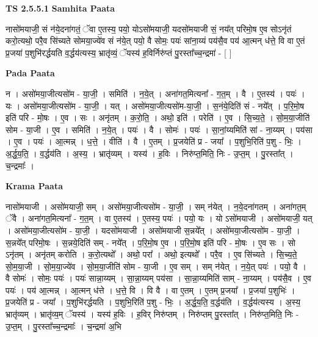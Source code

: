\documentclass[17pt]{extarticle}
\begin{document}
\textbf{TS 2.5.5.1 } \newline
\textbf{Samhita Paata} \newline

नासो॑मयाजी॒ सं न॑ये॒दना॑गतं॒ ॅवा ए॒तस्य॒ पयो॒ योऽसो॑मयाजी॒ यदसो॑मयाजी सं॒ नय᳚त् परिमो॒ष ए॒व सोऽनृ॑तं करो॒त्यथो॒ परै॒व सि॑च्यते सोमया॒ज्ये॑व सं न॑ये॒त् पयो॒ वै सोमः॒ पयः॑ सांना॒य्यं पय॑सै॒व पय॑ आ॒त्मन् ध॑त्ते॒ वि वा ए॒तं प्र॒जया॑ प॒शुभि॑रर्द्धयति व॒र्द्धय॑त्यस्य॒ भ्रातृ॑व्यं॒ ॅयस्य॑ ह॒विर्निरु॑प्तं पु॒रस्ता᳚च्च॒न्द्रमा॑ - [  ] \newline

\textbf{Pada Paata} \newline

न । असो॑मया॒जीत्यसो॑म - या॒जी॒ । समिति॑ । न॒ये॒त् । अना॑गत॒मित्यना᳚ - ग॒त॒म् । वै । ए॒तस्य॑ । पयः॑ । यः । असो॑मया॒जीत्यसो॑म - या॒जी॒ । यत् । असो॑मया॒जीत्यसो॑म-या॒जी॒ । स॒नंये॒दिति॑ सं - नये᳚त् । प॒रि॒मो॒ष इति॑ परि - मो॒षः । ए॒व । सः । अनृ॑तम् । क॒रो॒ति॒ । अथो॒ इति॑ । परेति॑ । ए॒व । सि॒च्य॒ते॒ । सो॒म॒या॒जीति॑ सोम - या॒जी । ए॒व । समिति॑ । न॒ये॒त् । पयः॑ । वै । सोमः॑ । पयः॑ । सा॒नां॒य्यमिति॑ सां - ना॒य्यम् । पय॑सा । ए॒व । पयः॑ । आ॒त्मन्न् । ध॒त्ते॒ । वीति॑ । वै । ए॒तम् । प्र॒जयेति॑ प्र - जया᳚ । प॒शुभि॒रिति॑ प॒शु - भिः॒ । अ॒र्द्ध॒य॒ति॒ । व॒र्द्धय॑ति । अ॒स्य॒ । भ्रातृ॑व्यम् । यस्य॑ । ह॒विः । निरु॑प्त॒मिति॒ निः - उ॒प्त॒म् । पु॒रस्ता᳚त् । च॒न्द्रमाः᳚ ।  \newline


\textbf{Krama Paata} \newline

नासो॑मयाजी । असो॑मयाजी॒ सम् । असो॑मया॒जीत्यसो॑म - या॒जी॒ । सम् न॑येत् । न॒ये॒दना॑गतम् । अना॑गत॒म् ॅवै । अना॑गत॒मित्यना᳚ - ग॒त॒म् । वा ए॒तस्य॑ । ए॒तस्य॒ पयः॑ । पयो॒ यः । यो ऽसो॑मयाजी । असो॑मयाजी॒ यत् । असो॑मया॒जीत्यसो॑म - या॒जी॒ । यदसो॑मयाजी । असो॑मयाजी स॒न्नये᳚त् । असो॑मया॒जीत्यसो॑म - या॒जी॒ । स॒न्नये᳚त् परिमो॒षः । स॒न्नये॒दिति॑ सम् - नये᳚त् । प॒रि॒मो॒ष ए॒व । प॒रि॒मो॒ष इति॑ परि - मो॒षः । ए॒व सः । सो ऽनृ॑तम् । अनृ॑तम् करोति । क॒रो॒त्यथो᳚ । अथो॒ परा᳚ । अथो॒ इत्यथो᳚ । परै॒व । ए॒व सि॑च्यते । सि॒च्य॒ते॒ सो॒म॒या॒जी । सो॒म॒या॒ज्ये॑व । सो॒म॒या॒जीति॑ सोम - या॒जी । ए॒व सम् । सम् न॑येत् । न॒ये॒त् पयः॑ । पयो॒ वै । वै सोमः॑ । सोमः॒ पयः॑ । पयः॑ सान्ना॒य्यम् । सा॒न्ना॒य्यम् पय॑सा । सा॒न्ना॒य्यमिति॑ साम् - ना॒य्यम् । पय॑सै॒व । ए॒व पयः॑ । पय॑ आ॒त्मन्न् । आ॒त्मन् ध॑त्ते । ध॒त्ते॒ वि । वि वै । वा ए॒तम् । ए॒तम् प्र॒जया᳚ । प्र॒जया॑ प॒शुभिः॑ । प्र॒जयेति॑ प्र - जया᳚ । प॒शुभि॑रर्द्धयति । प॒शुभि॒रिति॑ प॒शु - भिः॒ । अ॒र्द्ध॒य॒ति॒ व॒र्द्धय॑ति । व॒र्द्धय॑त्यस्य । अ॒स्य॒ भ्रातृ॑व्यम् । भ्रातृ॑व्य॒म् ॅयस्य॑ । यस्य॑ ह॒विः । ह॒विर् निरु॑प्तम् । निरु॑प्तम् पु॒रस्ता᳚त् । निरु॑प्त॒मिति॒ निः - उ॒प्त॒म् । पु॒रस्ता᳚च्च॒न्द्रमाः᳚ । च॒न्द्रमा॑ अ॒भि \newline
\end{document}
